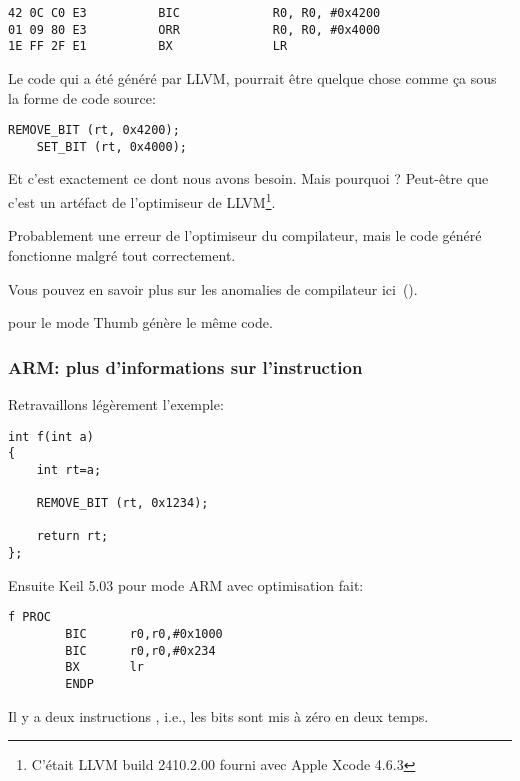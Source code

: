 \begin{lstlisting}[caption=\OptimizingXcodeIV (\ARMMode),label=ARM_leaf_example3,style=customasmARM]
42 0C C0 E3          BIC             R0, R0, #0x4200
01 09 80 E3          ORR             R0, R0, #0x4000
1E FF 2F E1          BX              LR
\end{lstlisting}

Le code qui a été généré par LLVM, pourrait être quelque chose  comme ça sous la
forme de code source:

\begin{lstlisting}[style=customc]
    REMOVE_BIT (rt, 0x4200);
    SET_BIT (rt, 0x4000);
\end{lstlisting}

Et c'est exactement ce dont nous avons besoin.
Mais pourquoi ?
Peut-être que c'est un artéfact de l'optimiseur de LLVM\footnote{C'était LLVM build
2410.2.00 fourni avec Apple Xcode 4.6.3}.

Probablement une erreur de l'optimiseur du compilateur, mais le code généré fonctionne
malgré tout correctement.

Vous pouvez en savoir plus sur les anomalies de compilateur ici~().

\OptimizingXcodeIV pour le mode Thumb génère le même code.

\subsubsection{ARM: plus d'informations sur l'instruction }

Retravaillons légèrement l'exemple:

\begin{lstlisting}[style=customc]
int f(int a)
{
    int rt=a;

    REMOVE_BIT (rt, 0x1234);

    return rt;
};
\end{lstlisting}

Ensuite Keil 5.03 pour mode ARM avec optimisation fait:

\begin{lstlisting}[style=customasmARM]
f PROC
        BIC      r0,r0,#0x1000
        BIC      r0,r0,#0x234
        BX       lr
        ENDP
\end{lstlisting}

Il y a deux instructions , i.e., les bits  sont mis à zéro en
deux temps.

